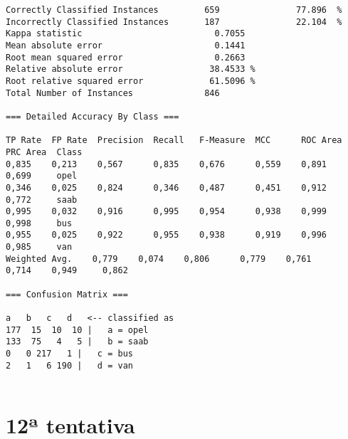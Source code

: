 \documentclass[
	article,			%
	11pt,				%
	oneside,			%
	a4paper,			%
	english,			%
	brazil,				%
	sumario=tradicional
	]{abntex2}
\begin{document}
\begin{lstlisting}
Correctly Classified Instances         659               77.896  %
Incorrectly Classified Instances       187               22.104  %
Kappa statistic                          0.7055
Mean absolute error                      0.1441
Root mean squared error                  0.2663
Relative absolute error                 38.4533 %
Root relative squared error             61.5096 %
Total Number of Instances              846     

=== Detailed Accuracy By Class ===

TP Rate  FP Rate  Precision  Recall   F-Measure  MCC      ROC Area  PRC Area  Class
0,835    0,213    0,567      0,835    0,676      0,559    0,891     0,699     opel
0,346    0,025    0,824      0,346    0,487      0,451    0,912     0,772     saab
0,995    0,032    0,916      0,995    0,954      0,938    0,999     0,998     bus
0,955    0,025    0,922      0,955    0,938      0,919    0,996     0,985     van
Weighted Avg.    0,779    0,074    0,806      0,779    0,761      0,714    0,949     0,862     

=== Confusion Matrix ===

a   b   c   d   <-- classified as
177  15  10  10 |   a = opel
133  75   4   5 |   b = saab
0   0 217   1 |   c = bus
2   1   6 190 |   d = van


\end{lstlisting}

\newpage

\section{12ª tentativa}
\end{document}
